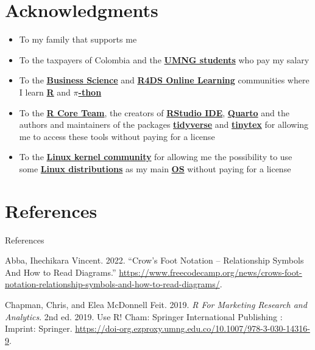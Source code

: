 \documentclass[
  ignorenonframetext,
]{beamer}
\newlength{\cslhangindent}
\newenvironment{CSLReferences}[2] %
 {\begin{list}{}{%
  \setlength{\itemindent}{0pt}
  \setlength{\leftmargin}{0pt}
  \setlength{\parsep}{0pt}
  \ifodd #1
   \setlength{\leftmargin}{\cslhangindent}
   \setlength{\itemindent}{-1\cslhangindent}
  \fi
  \setlength{\itemsep}{#2\baselineskip}}}
 {\end{list}}
\begin{document}
\section{Acknowledgments}\label{acknowledgments}

\begin{frame}{}
\label{section-13}
\begin{itemize}
\item
  To my family that supports me
\item
  To the taxpayers of Colombia and the
  \href{https://www.umng.edu.co/estudiante}{\textbf{UMNG students}} who
  pay my salary
\item
  To the \href{https://www.business-science.io/}{\textbf{Business
  Science}} and \href{https://www.rfordatasci.com/}{\textbf{R4DS Online
  Learning}} communities where I learn
  \href{https://www.r-project.org/about.html}{\textbf{R}} and
  \href{https://www.python.org/about/}{\textbf{\(\pi\)-thon}}
\item
  To the \href{https://www.r-project.org/contributors.html}{\textbf{R
  Core Team}}, the creators of
  \href{https://posit.co/products/open-source/rstudio/}{\textbf{RStudio
  IDE}}, \href{https://quarto.org/}{\textbf{Quarto}} and the authors and
  maintainers of the packages
  \href{https://CRAN.R-project.org/package=tidyverse}{\textbf{tidyverse}}
  and
  \href{https://CRAN.R-project.org/package=tinytex}{\textbf{tinytex}}
  for allowing me to access these tools without paying for a license
\item
  To the \href{https://www.kernel.org/category/about.html}{\textbf{Linux
  kernel community}} for allowing me the possibility to use some
  \href{https://static.lwn.net/Distributions/}{\textbf{Linux
  distributions}} as my main
  \href{https://en.wikipedia.org/wiki/Operating_system}{\textbf{OS}}
  without paying for a license
\end{itemize}
\end{frame}

\section*{References}\label{references}

\begin{frame}[allowframebreaks]{References}
\label{refs}
\begin{CSLReferences}{1}{0}
Abba, Ihechikara Vincent. 2022. {``Crow's {Foot} {Notation} --
{Relationship} {Symbols} {And} {How} to {Read} {Diagrams}.''}
\url{https://www.freecodecamp.org/news/crows-foot-notation-relationship-symbols-and-how-to-read-diagrams/}.

Chapman, Chris, and Elea McDonnell Feit. 2019. \emph{R {For} {Marketing}
{Research} and {Analytics}}. 2nd ed. 2019. Use {R}! Cham: Springer
International Publishing : Imprint: Springer.
\url{https://doi-org.ezproxy.umng.edu.co/10.1007/978-3-030-14316-9}.

\end{CSLReferences}
\end{frame}
\end{document}
